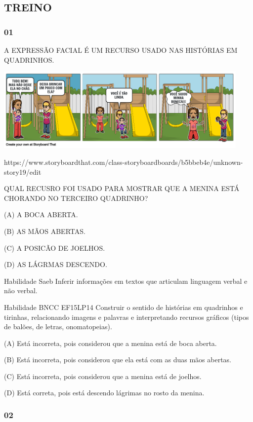 \subsection{TREINO}\label{treino-6}

\subsubsection{01}\label{section-91}

A EXPRESSÃO FACIAL É UM RECURSO USADO NAS HISTÓRIAS EM QUADRINHOS.

\includegraphics[width=4.88436in,height=1.61667in]{media/image136.png}

https://www.storyboardthat.com/class-storyboardboards/b5bbeb4e/unknown-story19/edit

QUAL RECUSRO FOI USADO PARA MOSTRAR QUE A MENINA ESTÁ CHORANDO NO
TERCEIRO QUADRINHO?

(A) A BOCA ABERTA.

(B) AS MÃOS ABERTAS.

(C) A POSICÃO DE JOELHOS.

(D) AS LÁGRMAS DESCENDO.

\protect\hypertarget{_Hlk129246313}{}{}Habilidade Saeb Inferir
informações em textos que articulam linguagem verbal e não verbal.

Habilidade BNCC EF15LP14 Construir o sentido de histórias em quadrinhos
e tirinhas, relacionando imagens e palavras e interpretando recursos
gráficos (tipos de balões, de letras, onomatopeias).

(A) Está incorreta, pois considerou que a menina está de boca aberta.

(B) Está incorreta, pois considerou que ela está com as duas mãos
abertas.

(C) Está incorreta, pois considerou que a menina está de joelhos.

(D) Está correta, pois está descendo lágrimas no rosto da menina.

\subsubsection{02}\label{section-92}

